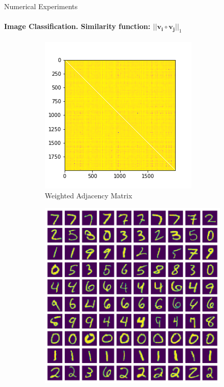 \documentclass[10pt,a4paper, nocenter]{beamer}
\begin{document}
	\begin{frame}{Numerical Experiments}
		\framesubtitle{Image Classification. Similarity function: $\lvert \lvert \mathbf{v_i} \circ \mathbf{v_j} \rvert \rvert_1$}
		\begin{figure}[h]
			\begin{center}
				\begin{subfigure}[b]{0.45\textwidth}
					\centering
					\includegraphics[width=\textwidth]{../../images/w_0norm.png}
					\caption{Weighted Adjacency Matrix}
					\label{fig:w_0norm}
				\end{subfigure}           
				\begin{subfigure}[b]{0.45\textwidth}
					\centering
					\includegraphics[width=\textwidth]{../../images/number_clustering_10_0norm.png}

\end{subfigure}
\end{center}
\end{figure}
\end{frame}
\end{document}
